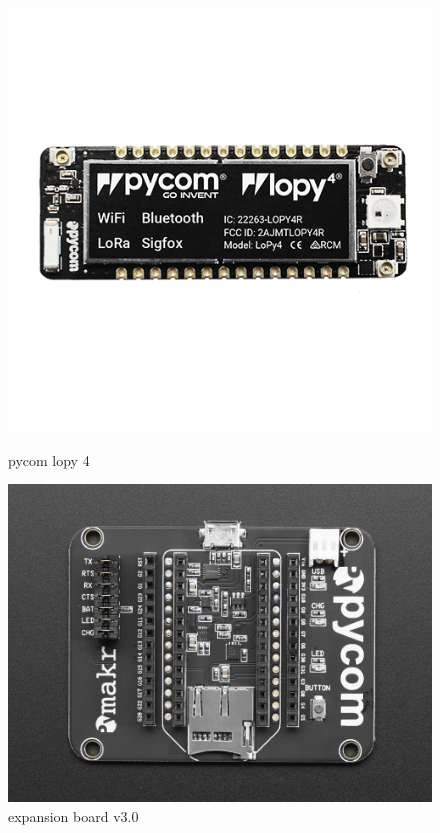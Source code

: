 \documentclass{article}
\begin{document}
\begin{figure}[H]
  \centering
  \begin{minipage}[b]{0.4\textwidth}
    \includegraphics[keepaspectratio=true,scale=1.7]{pycom_lopy4.jpeg}
        \caption{pycom lopy 4}
  \end{minipage}
  \hfill
  \begin{minipage}[b]{0.4\textwidth}
   \includegraphics[keepaspectratio=true,scale=0.5]{pycom_expansion_board.jpeg}
    \caption{expansion board v3.0}
  \end{minipage}
\end{figure}
\end{document}
